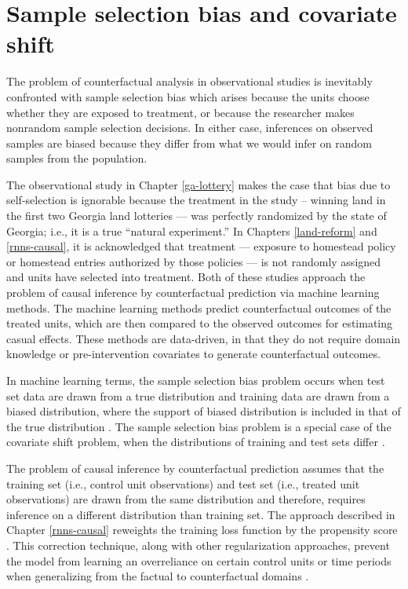 \section{Sample selection bias and covariate shift}
The problem of counterfactual analysis in observational studies is inevitably confronted with sample selection bias \citep{heckman1979sample} which arises because the units choose whether they are exposed to treatment, or because the researcher makes nonrandom sample selection decisions. In either case, inferences on observed samples are biased because they differ from what we would infer on random samples from the population. 

The observational study in Chapter \ref{ga-lottery} makes the case that bias due to self-selection is ignorable because the treatment in the study -- winning land in the first two Georgia land lotteries --- was perfectly randomized by the state of Georgia; i.e., it is a true ``natural experiment.'' In Chapters \ref{land-reform} and \ref{rnns-causal}, it is acknowledged that treatment --- exposure to homestead policy or homestead entries authorized by those policies --- is not randomly assigned and units have selected into treatment. Both of these studies approach the problem of causal inference by counterfactual prediction via machine learning methods. The machine learning methods predict counterfactual outcomes of the treated units, which are then compared to the observed outcomes for estimating casual effects. These methods are data-driven, in that they do not require domain knowledge or pre-intervention covariates to generate counterfactual outcomes.  

In machine learning terms, the sample selection bias problem occurs when test set data are drawn from a true distribution and training data are drawn from a biased distribution, where the support of biased distribution is included in that of the true distribution \citep{cortes2008sample}. The sample selection bias problem is a special case of the covariate shift problem, when the distributions of training and test sets differ \citep{bickel2007discriminative}. 

The problem of causal inference by counterfactual prediction assumes that the training set (i.e., control unit observations) and test set (i.e., treated unit observations) are drawn from the same distribution and therefore, requires inference on a different distribution than training set. The approach described in Chapter \ref{rnns-causal} reweights the training loss function by the propensity score \citep{rosenbaum1983central}. This correction technique, along with other regularization approaches, prevent the model from learning an overreliance on certain control units or time periods when generalizing from the factual to counterfactual domains \citep{johansson2016learning}.
	

